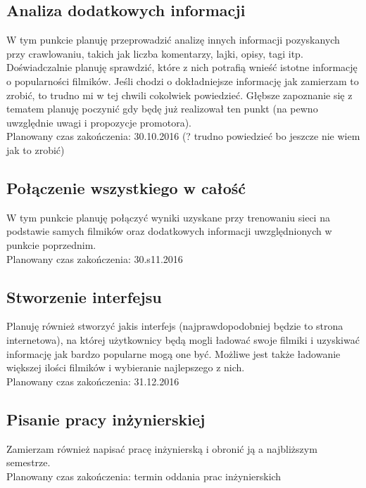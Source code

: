 \documentclass{article}
\begin{document}
\subsection{Analiza dodatkowych informacji}
W tym punkcie planuję przeprowadzić analizę innych informacji pozyskanych przy crawlowaniu, takich jak liczba komentarzy, lajki, opisy, tagi itp. Doświadczalnie planuję sprawdzić, które z nich potrafią wnieść istotne informację o popularności filmików. Jeśli chodzi o dokładniejsze informację jak zamierzam to zrobić, to trudno mi w tej chwili cokolwiek powiedzieć. Głębsze zapoznanie się z tematem planuję poczynić gdy będę już realizował ten punkt (na pewno uwzględnie uwagi i propozycje promotora).
\\Planowany czas zakończenia: 30.10.2016 (? trudno powiedzieć bo jeszcze nie wiem jak to zrobić)

\subsection{Połączenie wszystkiego w całość}
W tym punkcie planuję połączyć wyniki uzyskane przy trenowaniu sieci na podstawie samych filmików oraz dodatkowych informacji uwzględnionych w punkcie poprzednim.
\\Planowany czas zakończenia: 30.s11.2016

\subsection{Stworzenie interfejsu}
Planuję również stworzyć jakis interfejs (najprawdopodobniej będzie to strona internetowa), na której użytkownicy będą mogli ładować swoje filmiki i uzyskiwać informację jak bardzo popularne mogą one być. Możliwe jest także ładowanie większej ilości filmików i wybieranie najlepszego z nich.
\\Planowany czas zakończenia: 31.12.2016

\subsection{Pisanie pracy inżynierskiej}
Zamierzam również napisać pracę inżynierską i obronić ją a najbliższym semestrze.
\\Planowany czas zakończenia: termin oddania prac inżynierskich
 
\end{document}
